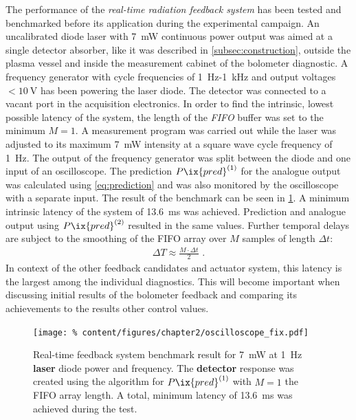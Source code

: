             The performance of the \textit{real-time radiation feedback system} has been tested and benchmarked before its application during the experimental campaign. An uncalibrated diode laser with \SI{7}{\milli\watt} continuous power output was aimed at a single detector absorber, like it was described in \cref{subsec:construction}, outside the plasma vessel and inside the measurement cabinet of the bolometer diagnostic. A frequency generator with cycle frequencies of \SI{1}{\hertz}-\SI{1}{\kilo\hertz} and output voltages $<\SI{10}{\volt}$ has been powering the laser diode. The detector was connected to a vacant port in the acquisition electronics. In order to find the intrinsic, lowest possible latency of the system, the length of the \textit{FIFO} buffer was set to the minimum $M=1$. A measurement program was carried out while the laser was adjusted to its maximum \SI{7}{\milli\watt} intensity at a square wave cycle frequency of \SI{1}{\hertz}. The output of the frequency generator was split between the diode and one input of an oscilloscope. The prediction $P\ix{pred}^{\left(1\right)}$ for the analogue output was calculated using \cref{eq:prediction} and was also monitored by the oscilloscope with a separate input. The result of the benchmark can be seen in \cref{fig:oscilloscope}. A minimum intrinsic latency of the system of \SI{13.6}{\milli\second} was achieved. Prediction and analogue output using $P\ix{pred}^{\left(2\right)}$ resulted in the same values. Further temporal delays are subject to the smoothing of the FIFO array over $M$ samples of length $\Delta t$:%
%
            \begin{align*}%
                \Delta T\approx\frac{M\cdot\Delta t}{2}\,\,.%
            \end{align*}%
%
            In context of the other feedback candidates and actuator system, this latency is the largest among the individual diagnostics. This will become important when discussing initial results of the bolometer feedback and comparing its achievements to the results other control values.%
%
            \begin{figure}[t]%
                \centering%
                \texttt{[image: \%
                    content/figures/chapter2/oscilloscope\_fix.pdf]}%
                \caption{Real-time feedback system benchmark result for \SI{7}{\milli\watt} at \SI{1}{\hertz} \textbf{laser} diode power and frequency. The \textbf{detector} response was created using the algorithm for $P\ix{pred}^{\left(1\right)}$ with $M=1$ the FIFO array length. A total, minimum latency of \SI{13.6}{\milli\second} was achieved during the test.}\label{fig:oscilloscope}%
            \end{figure}%
%
